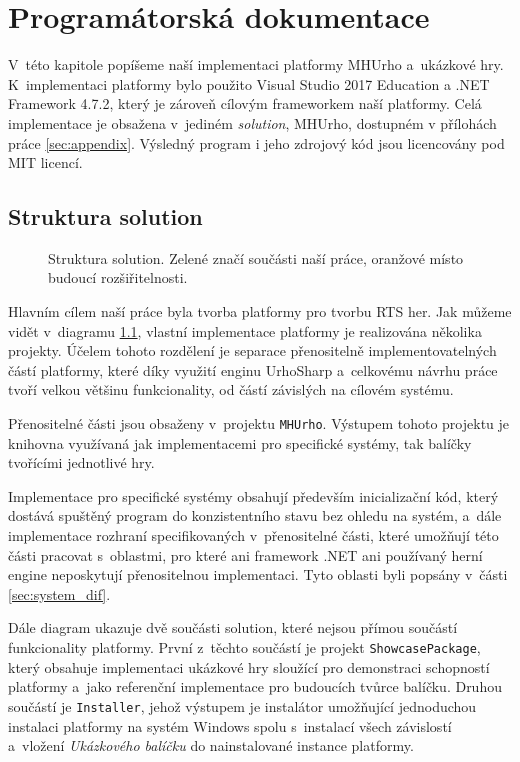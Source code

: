 \chapter{Programátorská dokumentace}
V~této kapitole popíšeme naší implementaci platformy MHUrho a~ukázkové hry. K~implementaci platformy bylo použito Visual Studio 2017 Education a .NET Framework 4.7.2, který je zároveň cílovým frameworkem naší platformy. Celá implementace je obsažena v~jediném \textit{solution}, MHUrho, dostupném v přílohách práce \ref{sec:appendix}. Výsledný program i jeho zdrojový kód jsou licencovány pod MIT licencí.

\section{Struktura solution}

\begin{figure}[h]
	\centering
	\fontsize{10pt}{11pt}\selectfont
	\def\svgwidth{0.9\textwidth}
	
	\caption{Struktura solution. Zelené značí součásti naší práce, oranžové místo budoucí rozšiřitelnosti.}
	\label{fig:solution_structure}
\end{figure}

Hlavním cílem naší práce byla tvorba platformy pro tvorbu RTS her. Jak můžeme vidět v~diagramu \ref{fig:solution_structure}, vlastní implementace platformy je realizována několika projekty. Účelem tohoto rozdělení je separace přenositelně implementovatelných částí platformy, které díky využití enginu UrhoSharp a~celkovému návrhu práce tvoří velkou většinu funkcionality, od částí závislých na cílovém systému. 

Přenositelné části jsou obsaženy v~projektu \texttt{MHUrho}. Výstupem tohoto projektu je knihovna využívaná jak implementacemi pro specifické systémy, tak balíčky tvořícími jednotlivé hry. 

Implementace pro specifické systémy obsahují především inicializační kód, který dostává spuštěný program do konzistentního stavu bez ohledu na systém, a~dále implementace rozhraní specifikovaných v~přenositelné části, které umožňují této části pracovat s~oblastmi, pro které ani framework .NET ani používaný herní engine neposkytují přenositelnou implementaci. Tyto oblasti byli popsány v~části \ref{sec:system_dif}.

Dále diagram ukazuje dvě součásti solution, které nejsou přímou součástí funkcionality platformy. První z~těchto součástí je projekt \texttt{ShowcasePackage}, který obsahuje implementaci ukázkové hry sloužící pro demonstraci schopností platformy a~jako referenční implementace pro budoucích tvůrce balíčku. Druhou součástí je \texttt{Installer}, jehož výstupem je instalátor umožňující jednoduchou instalaci platformy na systém Windows spolu s~instalací všech závislostí a~vložení \textit{Ukázkového balíčku} do nainstalované instance platformy.

